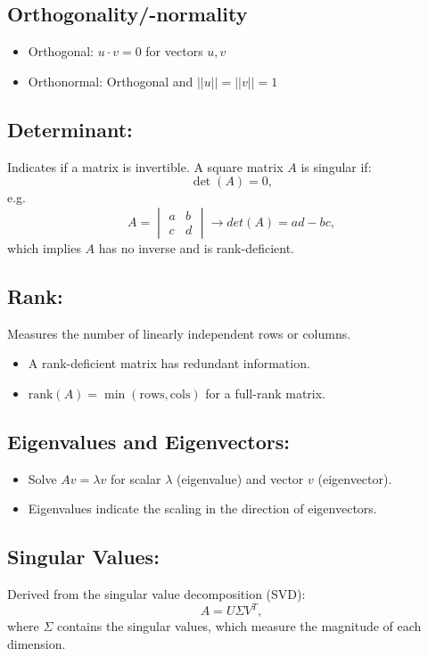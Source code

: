 \documentclass[12pt,a4paper]{article}
\begin{document}
\subsection{Orthogonality/-normality}

\begin{itemize}
\item Orthogonal: $u \cdot v = 0$ for vectors $u,v$
\item Orthonormal: Orthogonal and $||u||=||v||=1$
\end{itemize}
\subsection{Determinant:} Indicates if a matrix is invertible. A square matrix $A$ is singular if:
    \[ \det(A) = 0, \]
    e.g. \[{\displaystyle A =  {\begin{vmatrix}a&b\\c&d\end{vmatrix}}\rightarrow det(A)=ad-bc,}\]
    which implies $A$ has no inverse and is rank-deficient.
\subsection{Rank:} Measures the number of linearly independent rows or columns.
    \begin{itemize}
        \item A rank-deficient matrix has redundant information.
        \item $\text{rank}(A) = \min(\text{rows}, \text{cols})$ for a full-rank matrix.
    \end{itemize}
\subsection{Eigenvalues and Eigenvectors:}
    \begin{itemize}
        \item Solve $Av = \lambda v$ for scalar $\lambda$ (eigenvalue) and vector $v$ (eigenvector).
        \item Eigenvalues indicate the scaling in the direction of eigenvectors.
    \end{itemize}
\subsection{Singular Values:} Derived from the singular value decomposition (SVD):
    \[ A = U\Sigma V^T, \]
    where $\Sigma$ contains the singular values, which measure the magnitude of each dimension.
\end{document}
